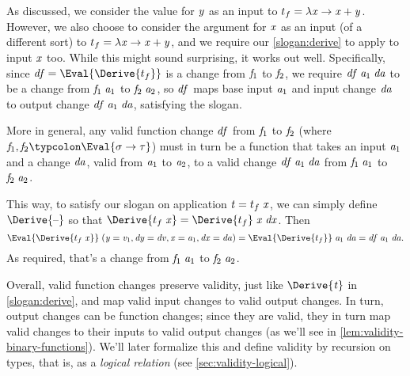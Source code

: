 As discussed, we consider the value for \ensuremath{\Varid{y}} as an input to \ensuremath{t_f\mathrel{=}\lambda \Varid{x}\to \Varid{x}\mathbin{+}\Varid{y}}.
%
However, we also choose to consider the argument for \ensuremath{\Varid{x}} as an
input (of a different sort) to \ensuremath{t_f\mathrel{=}\lambda \Varid{x}\to \Varid{x}\mathbin{+}\Varid{y}}, and we require
our \cref{slogan:derive} to apply to input \ensuremath{\Varid{x}} too. While this
might sound surprising, it works out well.
Specifically,
since \ensuremath{\Varid{df}\mathrel{=}\Eval{\Derive{t_f}}} is a change from \ensuremath{\Varid{f}_{1}} to \ensuremath{\Varid{f}_{2}}, we
require \ensuremath{\Varid{df}\;\Varid{a}_{1}\;\Varid{da}} to be a change from \ensuremath{\Varid{f}_{1}\;\Varid{a}_{1}} to \ensuremath{\Varid{f}_{2}\;\Varid{a}_{2}}, so
\ensuremath{\Varid{df}} maps base input \ensuremath{\Varid{a}_{1}} and input change \ensuremath{\Varid{da}} to output change
\ensuremath{\Varid{df}\;\Varid{a}_{1}\;\Varid{da}}, satisfying the slogan.

More in general, any valid function change \ensuremath{\Varid{df}} from \ensuremath{\Varid{f}_{1}} to \ensuremath{\Varid{f}_{2}}
(where \ensuremath{\Varid{f}_{1},\Varid{f}_{2}\typcolon\Eval{\sigma\to \tau}}) must in turn be a function
that takes an input \ensuremath{\Varid{a}_{1}} and a change \ensuremath{\Varid{da}}, valid from \ensuremath{\Varid{a}_{1}}
to \ensuremath{\Varid{a}_{2}}, to a valid change \ensuremath{\Varid{df}\;\Varid{a}_{1}\;\Varid{da}} from \ensuremath{\Varid{f}_{1}\;\Varid{a}_{1}} to \ensuremath{\Varid{f}_{2}\;\Varid{a}_{2}}.

This way, to satisfy our slogan on application \ensuremath{\Varid{t}\mathrel{=}t_f\;\Varid{x}}, we can
simply define \ensuremath{\Derive{\text{\textendash}}} so that \ensuremath{\Derive{t_f\;\Varid{x}}\mathrel{=}\Derive{t_f}\;\Varid{x}\;\Varid{dx}}. Then
\[\ensuremath{\Eval{\Derive{t_f\;\Varid{x}}}\;(\Varid{y}\mathrel{=}\Varid{v}_{1},\Varid{dy}\mathrel{=}\Varid{dv},\Varid{x}\mathrel{=}\Varid{a}_{1},\Varid{dx}\mathrel{=}\Varid{da})\mathrel{=}\Eval{\Derive{t_f}}\;\Varid{a}_{1}\;\Varid{da}\mathrel{=}\Varid{df}\;\Varid{a}_{1}\;\Varid{da}}.\]
As required, that's a
change from \ensuremath{\Varid{f}_{1}\;\Varid{a}_{1}} to \ensuremath{\Varid{f}_{2}\;\Varid{a}_{2}}.

Overall, valid function changes preserve validity, just like \ensuremath{\Derive{\Varid{t}}} in
\cref{slogan:derive}, and map valid input changes to valid output changes. In
turn, output changes can be function changes; since they are valid, they in turn
map valid changes to their inputs to valid output changes (as we'll see in
\cref{lem:validity-binary-functions}). We'll later formalize this and define
validity by recursion on types, that is, as a \emph{logical relation} (see
\cref{sec:validity-logical}).


